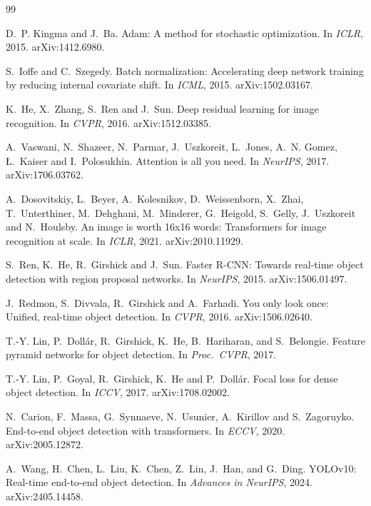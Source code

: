\begin{thebibliography}{99}

D.~P. Kingma and J.~Ba.
Adam: A method for stochastic optimization.
In \textit{ICLR}, 2015. arXiv:1412.6980.

S.~Ioffe and C.~Szegedy.
Batch normalization: Accelerating deep network training by reducing internal covariate shift.
In \textit{ICML}, 2015. arXiv:1502.03167.

K.~He, X.~Zhang, S.~Ren and J.~Sun.
Deep residual learning for image recognition.
In \textit{CVPR}, 2016. arXiv:1512.03385.

A.~Vaswani, N.~Shazeer, N.~Parmar, J.~Uszkoreit, L.~Jones, A.~N. Gomez, {\L}.~Kaiser and I.~Polosukhin.
Attention is all you need.
In \textit{NeurIPS}, 2017. arXiv:1706.03762.

A.~Dosovitskiy, L.~Beyer, A.~Kolesnikov, D.~Weissenborn, X.~Zhai, T.~Unterthiner, M.~Dehghani, M.~Minderer, G.~Heigold, S.~Gelly, J.~Uszkoreit and N.~Houlsby.
An image is worth 16x16 words: Transformers for image recognition at scale.
In \textit{ICLR}, 2021. arXiv:2010.11929.

S.~Ren, K.~He, R.~Girshick and J.~Sun.
Faster R-CNN: Towards real-time object detection with region proposal networks.
In \textit{NeurIPS}, 2015. arXiv:1506.01497.

J.~Redmon, S.~Divvala, R.~Girshick and A.~Farhadi.
You only look once: Unified, real-time object detection.
In \textit{CVPR}, 2016. arXiv:1506.02640.

T.-Y. Lin, P.~Doll\'ar, R.~Girshick, K.~He, B.~Hariharan, and S.~Belongie.
Feature pyramid networks for object detection.
In \textit{Proc.\ CVPR}, 2017.

T.-Y. Lin, P.~Goyal, R.~Girshick, K.~He and P.~Doll\'ar.
Focal loss for dense object detection.
In \textit{ICCV}, 2017. arXiv:1708.02002.

N.~Carion, F.~Massa, G.~Synnaeve, N.~Usunier, A.~Kirillov and S.~Zagoruyko.
End-to-end object detection with transformers.
In \textit{ECCV}, 2020. arXiv:2005.12872.

A.~Wang, H.~Chen, L.~Liu, K.~Chen, Z.~Lin, J.~Han, and G.~Ding.
YOLOv10: Real-time end-to-end object detection.
In \textit{Advances in NeurIPS}, 2024. arXiv:2405.14458.


\end{thebibliography}

